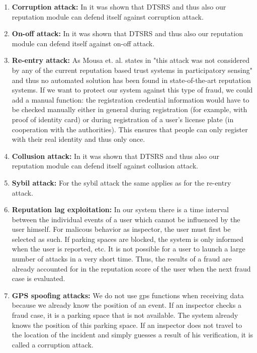 \documentclass[
a4paper,     %
titlepage,   %
14pt         %
]{scrartcl}  %
\theoremstyle{mystyle}
\begin{document}
\begin{enumerate}
\item \textbf{Corruption attack:} In \cite{mousa2017reputation} it was shown that DTSRS and thus also our reputation module can defend itself against corruption attack.
\item \textbf{On-off attack:} In \cite{mousa2017reputation} it was shown that DTSRS and thus also our reputation module can defend itself against on-off attack.
\item \textbf{Re-entry attack:} As Mousa et. al. states in \cite{mousa2015trust} "this attack was not considered by any of the current reputation based trust systems in participatory sensing" and thus no automated solution has been found in state-of-the-art reputation systems. If we want to protect our system against this type of fraud, we could add a manual function: the registration credential information would have to be checked manually either in general during registration  (for example, with proof of identity card) or during registration of a user's license plate (in cooperation with the authorities). This ensures that people can only register with their real identity and thus only once.
\item \textbf{Collusion attack:} In \cite{mousa2017reputation} it was shown that DTSRS and thus also our reputation module can defend itself against collusion attack.
\item \textbf{Sybil attack:} For the sybil attack the same applies as for the re-entry attack.
\item \textbf{Reputation lag exploitation:} In our system there is a time interval between the individual events of a user which cannot be influenced by the user himself. For malicous behavior as inspector, the user must first be selected as such. If parking spaces are blocked, the system is only informed when the user is reported, etc. It is not possible for a user to launch a large number of attacks in a very short time. Thus, the results of a fraud are already accounted for in the reputation score of the user when the next fraud case is evaluated.
\item \textbf{GPS spoofing attacks:} We do not use gps functions when receiving data because we already know the position of an event. If an inspector checks a fraud case, it is a parking space that is not available. The system already knows the position of this parking space. If an inspector does not travel to the location of the incident and simply guesses a result of his verification, it is called a corruption attack.

\end{enumerate}
\end{document}
